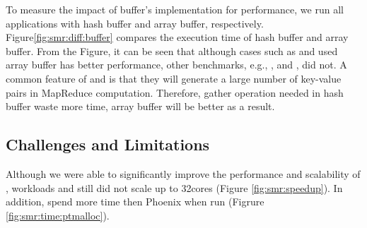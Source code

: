 To measure the impact of buffer's implementation for performance, we run all applications with hash buffer and array buffer, respectively.
Figure\ref{fig:smr:diff:buffer} compares the execution time of hash buffer and array buffer. 
From the Figure, it can be seen that although cases such as  and  used array buffer has better performance, other benchmarks, e.g., ,  and , did not.
A common feature of  and  is that they will generate a large number of key-value pairs in MapReduce computation.
Therefore, gather operation needed in hash buffer waste more time, array buffer will be better as a result.


\subsection{ Challenges and Limitations}	
Although we were able to significantly improve the performance and scalability of \myds, 
workloads  and  still did not scale up to 32cores (Figure \ref{fig:smr:speedup}).
In addition, \myds spend more time then Phoenix when run  (Figrure \ref{fig:smr:time:ptmalloc}). 

